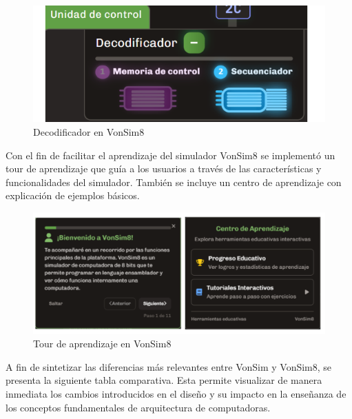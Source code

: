 \documentclass[12pt,oneside]{templates/unerthesis}
\begin{document}
\begin{figure}

{\centering \includegraphics[width=1\linewidth]{images/decodificador} 

}

\caption{Decodificador en VonSim8}\label{fig:decodificador}
\end{figure}

Con el fin de facilitar el aprendizaje del simulador VonSim8 se implementó un tour de aprendizaje que guía a los usuarios a través de las características y funcionalidades del simulador. También se incluye un centro de aprendizaje con explicación de ejemplos básicos.

\begin{figure}

{\centering \includegraphics[width=1\linewidth]{images/tour} 

}

\caption{Tour de aprendizaje en VonSim8}\label{fig:tour}
\end{figure}

A fin de sintetizar las diferencias más relevantes entre VonSim y VonSim8, se presenta la siguiente tabla comparativa. Esta permite visualizar de manera inmediata los cambios introducidos en el diseño y su impacto en la enseñanza de los conceptos fundamentales de arquitectura de computadoras.
\end{document}
